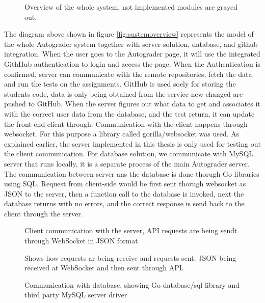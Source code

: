 \begin{figure}[h]
  \scalebox{1}{}
  \caption{Overview of the whole system, not implemented modules are grayed out.}
  \label{fig:systemoverview}
\end{figure}

The diagram above shown in figure \ref{fig:sustemoverview} represents the model of the whole Autograder system together with server solution, database, and github integration. When the user goes to the Autograder page, it will use the integrated GithHub authentication to login and access the page. When the Authentication is confirmed, server can communicate with the remote repositories, fetch the data and run the tests on the assignments. GitHub is used soely for storing the students code, data is only being obtained from the service new changed are pushed to GitHub. When the server figures out what data to get and associates it with the correct user data from the database, and the test return, it can update the front-end client through. Communication with the client happens through websocket. For this purpose a library called gorilla/websocket \cite{gorilla} was used. As explained earlier, the server implemented in this thesis is only used for testing out the client communication. For database solution, we communicate with MySQL server that runs locally, it is a separate process of the main Autograder server. The communication between server ans the database is done thorugh Go libraries using SQL. Request from client-side would be first sent thorugh websocket as JSON to the server, then a function call to the database is invoked, next the database returns with no errors, and the correct response is send back to the client through the server.  

\begin{figure}[h]
  \scalebox{1}{}
  \caption{Client communication with the server, API requests are being sendt through WebSocket in JSON format}
  \label{fig:clientoverview}
\end{figure}

\begin{figure}[h]
  \scalebox{1}{}
  \caption{Shows how requests ar being receive and requests sent. JSON being received at WebSocket and then sent through API.}
  \label{fig:serveroverview}
\end{figure}

\begin{figure}[h]
  \scalebox{1}{}
  \caption{Communication with database, showing Go database/sql library and third party MySQL server driver \cite{ziutekdriver}}
  \label{fig:databaseoverview}
\end{figure}

